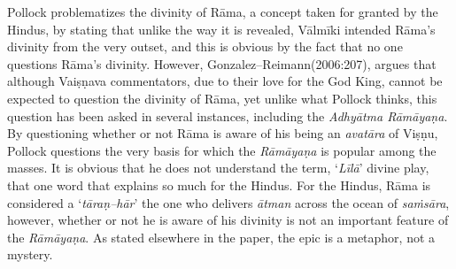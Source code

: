 Pollock problematizes the divinity of Rāma, a concept taken for granted by the Hindus, by stating that unlike the way it is revealed, Vālmīki intended Rāma’s divinity from the very outset, and this is obvious by the fact that no one questions Rāma’s divinity. However, Gonzalez–Reimann(2006:207), argues that although Vaiṣṇava commentators, due to their love for the God King, cannot be expected to question the divinity of Rāma, yet unlike what Pollock thinks, this question has been asked in several instances, including the \textit{Adhyātma Rāmāyaṇa}. By questioning whether or not Rāma is aware of his being an \textit{avatāra} of Viṣṇu, Pollock questions the very basis for which the \textit{Rāmāyaṇa} is popular among the masses. It is obvious that he does not understand the term, ‘\textit{Līlā}’ divine play, that one word that explains so much for the Hindus. For the Hindus, Rāma is considered a ‘\textit{tāraṇ–hār}’ the one who delivers \textit{ātman} across the ocean of \textit{saṁsāra}, however, whether or not he is aware of his divinity is not an important feature of the \textit{Rāmāyaṇa}. As stated elsewhere in the paper, the epic is a metaphor, not a mystery.

